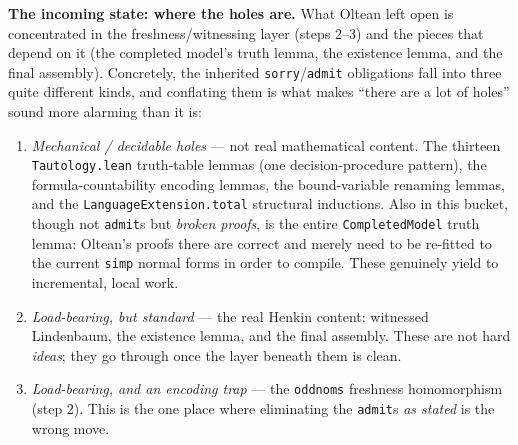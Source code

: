 \documentclass[11pt,a4paper]{article}
\renewcommand{\_}{\origtextunderscore\allowbreak}
\begin{document}
\textbf{The incoming state: where the holes are.} What Oltean left open is concentrated in the freshness/witnessing layer (steps 2--3) and the pieces that depend on it (the completed model's truth lemma, the existence lemma, and the final assembly). Concretely, the inherited \texttt{sorry}/\texttt{admit} obligations fall into three quite different kinds, and conflating them is what makes ``there are a lot of holes'' sound more alarming than it is:

\begin{enumerate}
\def\labelenumi{\arabic{enumi}.}
\item
  \emph{Mechanical / decidable holes} --- not real mathematical content. The thirteen \texttt{Tautology.lean} truth-table lemmas (one decision-procedure pattern), the formula-countability encoding lemmas, the bound-variable renaming lemmas, and the \texttt{LanguageExtension.total\_*} structural inductions. Also in this bucket, though not \texttt{admit}s but \emph{broken proofs}, is the entire \texttt{CompletedModel} truth lemma: Oltean's proofs there are correct and merely need to be re-fitted to the current \texttt{simp} normal forms in order to compile. These genuinely yield to incremental, local work.
\item
  \emph{Load-bearing, but standard} --- the real Henkin content: witnessed Lindenbaum, the existence lemma, and the final assembly. These are not hard \emph{ideas}; they go through once the layer beneath them is clean.
\item
  \emph{Load-bearing, and an encoding trap} --- the \texttt{odd\_noms} freshness homomorphism (step 2). This is the one place where eliminating the \texttt{admit}s \emph{as stated} is the wrong move.
\end{enumerate}
\end{document}
